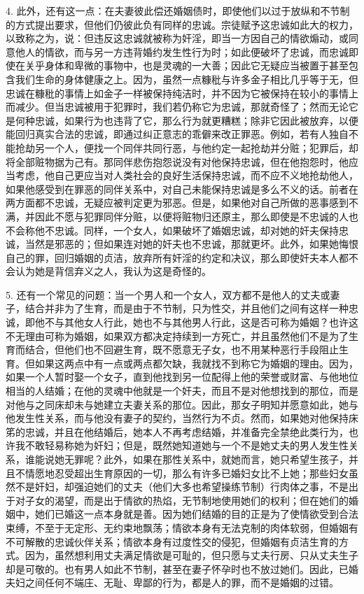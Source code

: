 4. 此外，还有这一点：在夫妻彼此偿还婚姻债时，即使他们以过于放纵和不节制的方式提出要求，但他们仍彼此负有同样的忠诚。宗徒赋予这忠诚如此大的权力，以致称之为，说：但违反这忠诚就被称为奸淫，即当一方因自己的情欲煽动，或同意他人的情欲，而与另一方违背婚约发生性行为时；如此便破坏了忠诚，而忠诚即使在关乎身体和卑微的事物中，也是灵魂的一大善；因此它无疑应当被置于甚至包含我们生命的身体健康之上。因为，虽然一点糠秕与许多金子相比几乎等于无，但忠诚在糠秕的事情上如金子一样被保持纯洁时，并不因为它被保持在较小的事情上而减少。但当忠诚被用于犯罪时，我们若仍称它为忠诚，那就奇怪了；然而无论它是何种忠诚，如果行为也违背了它，那么行为就更糟糕；除非它因此被放弃，以便能回归真实合法的忠诚，即通过纠正意志的乖僻来改正罪恶。例如，若有人独自不能抢劫另一个人，便找一个同伴共同行恶，与他约定一起抢劫并分赃；犯罪后，却将全部赃物据为己有。那同伴悲伤抱怨说没有对他保持忠诚，但在他抱怨时，他应当考虑，他自己更应当对人类社会的良好生活保持忠诚，而不应不义地抢劫他人，如果他感受到在罪恶的同伴关系中，对自己未能保持忠诚是多么不义的话。前者在两方面都不忠诚，无疑应被判定更为邪恶。但是，如果他对自己所做的恶事感到不满，并因此不愿与犯罪同伴分赃，以便将赃物归还原主，那么即使是不忠诚的人也不会称他不忠诚。同样，一个女人，如果破坏了婚姻忠诚，却对她的奸夫保持忠诚，当然是邪恶的；但如果连对她的奸夫也不忠诚，那就更坏。此外，如果她悔恨自己的罪，回归婚姻的贞洁，放弃所有奸淫的约定和决议，那么即使奸夫本人都不会认为她是背信弃义之人，我认为这是奇怪的。\par

5. 还有一个常见的问题：当一个男人和一个女人，双方都不是他人的丈夫或妻子，结合并非为了生育，而是由于不节制，只为性交，并且他们之间有这样一种忠诚，即他不与其他女人行此，她也不与其他男人行此，这是否可称为婚姻？也许这不无理由可称为婚姻，如果双方都决定持续到一方死亡，并且虽然他们不是为了生育而结合，但他们也不回避生育，既不愿意无子女，也不用某种恶行手段阻止生育。但如果这两点中有一点或两点都欠缺，我就找不到称它为婚姻的理由。因为，如果一个人暂时娶一个女子，直到他找到另一位配得上他的荣誉或财富、与他地位相当的人结婚；在他的灵魂中他就是一个奸夫，而且不是对他想找到的那位，而是对他与之同床却未与她建立夫妻关系的那位。因此，那女子明知并愿意如此，她与他发生性关系，而与他没有妻子的契约，当然行为不贞。然而，如果她对他保持床笫的忠诚，并且在他结婚后，她本人不再考虑结婚，并准备完全禁绝此类行为，也许我不敢轻易称她为奸妇；但是，既然她知道她与一个不是她丈夫的男人发生性关系，谁能说她无罪呢？此外，如果在那性关系中，就她而言，她只希望生孩子，并且不情愿地忍受超出生育原因的一切，那么有许多已婚妇女比不上她；那些妇女虽然不是奸妇，却强迫她们的丈夫（他们大多也希望操练节制）行肉体之事，不是出于对子女的渴望，而是出于情欲的热焰，无节制地使用她们的权利；但在她们的婚姻中，她们已婚这一点本身就是善。因为她们结婚的目的正是为了使情欲受到合法束缚，不至于无定形、无约束地飘荡；情欲本身有无法克制的肉体软弱，但婚姻有不可解散的忠诚伙伴关系；情欲本身有过度性交的侵犯，但婚姻有贞洁生育的方式。因为，虽然想利用丈夫满足情欲是可耻的，但只愿与丈夫行房、只从丈夫生子却是可敬的。也有男人如此不节制，甚至在妻子怀孕时也不放过她们。因此，已婚夫妇之间任何不端庄、无耻、卑鄙的行为，都是人的罪，而不是婚姻的过错。\par

